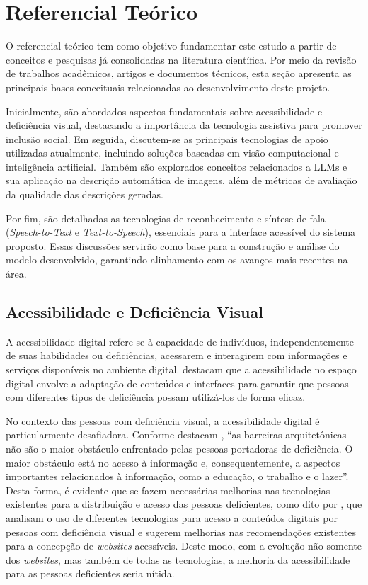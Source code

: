 \chapter{Referencial Teórico}  \label{cap:02}

O referencial teórico tem como objetivo fundamentar este estudo a partir de conceitos e pesquisas já consolidadas na literatura científica. Por meio da revisão de trabalhos acadêmicos, artigos e documentos técnicos, esta seção apresenta as principais bases conceituais relacionadas ao desenvolvimento deste projeto.

Inicialmente, são abordados aspectos fundamentais sobre acessibilidade e deficiência visual, destacando a importância da tecnologia assistiva para promover inclusão social. Em seguida, discutem-se as principais tecnologias de apoio utilizadas atualmente, incluindo soluções baseadas em visão computacional e inteligência artificial. Também são explorados conceitos relacionados a LLMs e sua aplicação na descrição automática de imagens, além de métricas de avaliação da qualidade das descrições geradas.

Por fim, são detalhadas as tecnologias de reconhecimento e síntese de fala (\textit{Speech-to-Text} e \textit{Text-to-Speech}), essenciais para a interface acessível do sistema proposto. Essas discussões servirão como base para a construção e análise do modelo desenvolvido, garantindo alinhamento com os avanços mais recentes na área.

\section{Acessibilidade e Deficiência Visual}

A acessibilidade digital refere-se à capacidade de indivíduos, independentemente de suas habilidades ou deficiências, acessarem e interagirem com informações e serviços disponíveis no ambiente digital.  destacam que a acessibilidade no espaço digital envolve a adaptação de conteúdos e interfaces para garantir que pessoas com diferentes tipos de deficiência possam utilizá-los de forma eficaz.

No contexto das pessoas com deficiência visual, a acessibilidade digital é particularmente desafiadora. Conforme destacam , “as barreiras arquitetônicas não são o maior obstáculo enfrentado pelas pessoas portadoras de deficiência. O maior obstáculo está no acesso à informação e, consequentemente, a aspectos importantes relacionados à informação, como a educação, o trabalho e o lazer”. Desta forma, é evidente que se fazem necessárias melhorias nas tecnologias existentes para a distribuição e acesso das pessoas deficientes, como dito por , que analisam o uso de diferentes tecnologias para acesso a conteúdos digitais por pessoas com deficiência visual e sugerem melhorias nas recomendações existentes para a concepção de \textit{websites} acessíveis. Deste modo, com a evolução não somente dos \textit{websites}, mas também de todas as tecnologias, a melhoria da acessibilidade para as pessoas deficientes seria nítida.

